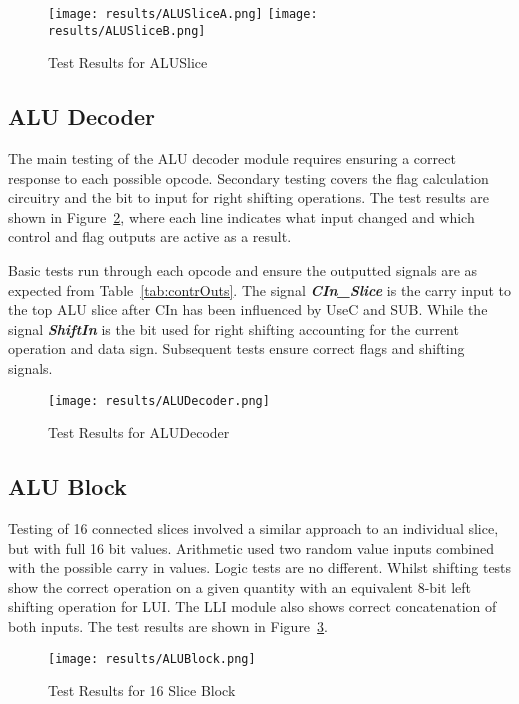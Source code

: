 \begin{figure}[h]
	\centering
	\texttt{[image: results/ALUSliceA.png]}
	\texttt{[image: results/ALUSliceB.png]}
	\caption{Test Results for ALUSlice}
	\label{fig:ALUSliceRes}
\end{figure}

\subsection{ALU Decoder}
The main testing of the ALU decoder module requires ensuring a correct response to each possible opcode. Secondary testing covers the flag calculation circuitry and the bit to input for right shifting operations. The test results are shown in Figure~\ref{fig:ALUDecoderRes}, where each line indicates what input changed and which control and flag outputs are active as a result. 

Basic tests run through each opcode and ensure the outputted signals are as expected from Table~\ref{tab:contrOuts}. The signal {\bf \it CIn\_Slice} is the carry input to the top ALU slice after CIn has been influenced by UseC and SUB. While the signal {\bf \it ShiftIn} is the bit used for right shifting accounting for the current operation and data sign. Subsequent tests ensure correct flags and shifting signals. 

\begin{figure}[h]
	\centering
	\texttt{[image: results/ALUDecoder.png]}
	\caption{Test Results for ALUDecoder}
	\label{fig:ALUDecoderRes}
\end{figure}

\subsection{ALU Block}
Testing of 16 connected slices involved a similar approach to an individual slice, but with full 16 bit values. Arithmetic used two random value inputs combined with the possible carry in values. Logic tests are no different. Whilst shifting tests show the correct operation on a given quantity with an equivalent 8-bit left shifting operation for LUI. The LLI module also shows correct concatenation of both inputs. The test results are shown in Figure~\ref{fig:ALUBlockRes}.

\begin{figure}[h]
	\centering
	\texttt{[image: results/ALUBlock.png]}
	\caption{Test Results for 16 Slice Block}
	\label{fig:ALUBlockRes}
\end{figure}

